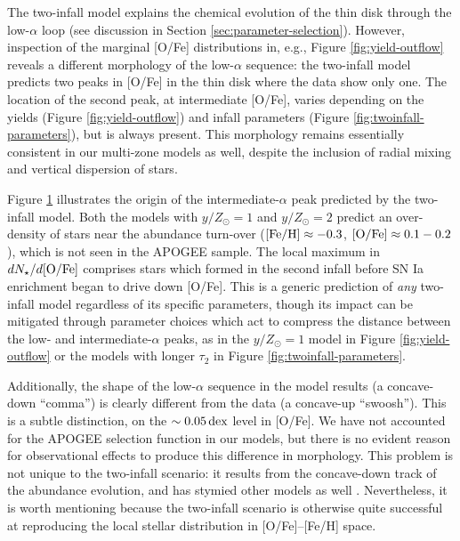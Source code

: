 \documentclass[twocolumn,twocolappendix,linenumbers]{aastex631}
\newcommand{\mathFeH}{{\rm [Fe/H]}}
\newcommand{\mathOFe}{{\rm [O/Fe]}}
\newcommand{\dex}{\,{\rm dex}}
\begin{document}
\begin{figure}
    \label{fig:ofe-feh-density}
\end{figure}

The two-infall model explains the chemical evolution of the thin disk through the low-$\alpha$ loop (see discussion in Section \ref{sec:parameter-selection}). However, inspection of the marginal [O/Fe] distributions in, e.g., Figure \ref{fig:yield-outflow} reveals a different morphology of the low-$\alpha$ sequence: the two-infall model predicts two peaks in [O/Fe] in the thin disk where the data show only one. The location of the second peak, at intermediate [O/Fe], varies depending on the yields (Figure \ref{fig:yield-outflow}) and infall parameters (Figure \ref{fig:twoinfall-parameters}), but is always present. This morphology remains essentially consistent in our multi-zone models as well, despite the inclusion of radial mixing and vertical dispersion of stars.

Figure \ref{fig:ofe-feh-density} illustrates the origin of the intermediate-$\alpha$ peak predicted by the two-infall model. Both the models with $y/Z_\odot=1$ and $y/Z_\odot=2$ predict an over-density of stars near the abundance turn-over ($\mathFeH\approx-0.3$, $\mathOFe\approx0.1-0.2$), which is not seen in the APOGEE sample. 
The local maximum in $dN_\star/d\mathOFe$ comprises stars which formed in the second infall before SN Ia enrichment began to drive down [O/Fe].
This is a generic prediction of {\it any} two-infall model regardless of its specific parameters, though its impact can be mitigated through parameter choices which act to compress the distance between the low- and intermediate-$\alpha$ peaks, as in the $y/Z_\odot=1$ model in Figure \ref{fig:yield-outflow} or the models with longer $\tau_2$ in Figure \ref{fig:twoinfall-parameters}.

Additionally, the shape of the low-$\alpha$ sequence in the model results (a concave-down ``comma'') is clearly different from the data (a concave-up ``swoosh''). This is a subtle distinction, on the $\sim0.05\dex$ level in [O/Fe]. We have not accounted for the APOGEE selection function in our models, but there is no evident reason for observational effects to produce this difference in morphology. This problem is not unique to the two-infall scenario: it results from the concave-down track of the abundance evolution, and has stymied other models as well \citep[e.g.,][]{minchev_chemodynamical_2013,johnson_stellar_2021,prantzos_origin_2023}. Nevertheless, it is worth mentioning because the two-infall scenario is otherwise quite successful at reproducing the local stellar distribution in [O/Fe]--[Fe/H] space.
\end{document}
